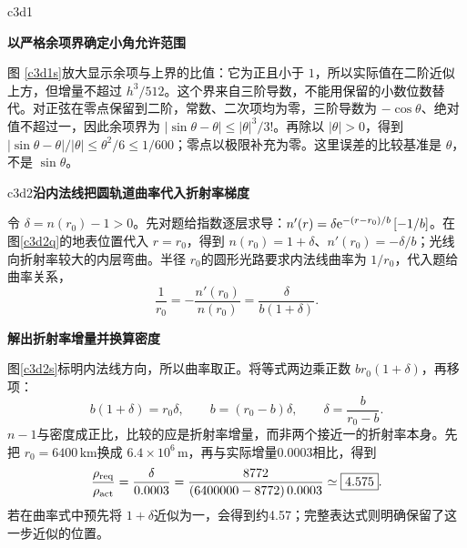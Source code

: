 \begin{drillsolution}{c3d1}
\par\medskip{}\noindent\textbf{以严格余项界确定小角允许范围}\par\nobreak
图 \ref{c3d1s}放大显示余项与上界的比值：它为正且小于 $1$，所以实际值在二阶近似上方，但增量不超过 $h^3/512$。这个界来自三阶导数，不能用保留的小数位数替代。对正弦在零点保留到二阶，常数、二次项均为零，三阶导数为 $-\cos\theta$、绝对值不超过一，因此余项界为 $|\sin\theta-\theta|\le|\theta|^3/3!$。再除以 $|\theta|>0$，得到
$|\sin\theta-\theta|/|\theta|\le\theta^2/6\le1/600$；零点以极限补充为零。这里误差的比较基准是 $\theta$，不是 $\sin\theta$。
\end{drillsolution}
\begin{drillsolution}{c3d2}\textbf{沿内法线把圆轨道曲率代入折射率梯度}\par\nobreak
令 $\delta=n(r_0)-1>0$。先对题给指数逐层求导：$n'(r)=\delta\mathrm e^{-(r-r_0)/b}\,[-1/b]$。在图\ref{c3d2q}的地表位置代入 $r=r_0$，得到 $n(r_0)=1+\delta$、$n'(r_0)=-\delta/b$；光线向折射率较大的内层弯曲。半径 $r_0$的圆形光路要求内法线曲率为 $1/r_0$，代入题给曲率关系，
\[\frac1{r_0}=-\frac{n'(r_0)}{n(r_0)}
 =\frac{\delta}{b(1+\delta)}.\]



\par\medskip{}\noindent\textbf{解出折射率增量并换算密度}\par\nobreak
图\ref{c3d2s}标明内法线方向，所以曲率取正。将等式两边乘正数 $br_0(1+\delta)$，再移项：
\[b(1+\delta)=r_0\delta,\qquad
b=(r_0-b)\delta,\qquad
\delta=\frac b{r_0-b}.\]
$n-1$与密度成正比，比较的应是折射率增量，而非两个接近一的折射率本身。先把 $r_0=6400\,\mathrm{km}$换成 $6.4\times10^6\,\mathrm m$，再与实际增量0.0003相比，得到
\[\frac{\rho_{\rm req}}{\rho_{\rm act}}
 =\frac{\delta}{0.0003}
 =\frac{8772}{(6400000-8772)\,0.0003}
 \simeq\boxed{4.575}.\]
若在曲率式中预先将 $1+\delta$近似为一，会得到约4.57；完整表达式则明确保留了这一步近似的位置。



\end{drillsolution}

